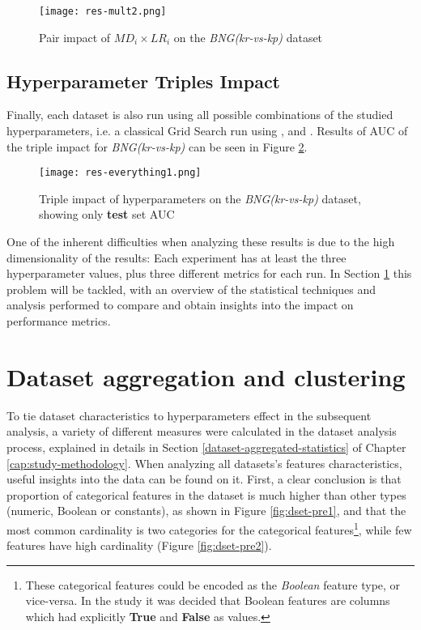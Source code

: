 \begin{figure}[!h]
    \centering
    \texttt{[image: res-mult2.png]}
    \caption{Pair impact of $MD_i \times LR_i$  on the \textit{BNG(kr-vs-kp)} dataset}
    \label{fig:res-mult2}
\end{figure}

\subsection{Hyperparameter Triples Impact}

Finally, each dataset is also run using all possible combinations of the studied hyperparameters, i.e. a classical Grid Search run using ,  and . Results of AUC of the triple impact for  \textit{BNG(kr-vs-kp)} can be seen in Figure \ref{fig:res-all1}.

\begin{figure}[!h]
    \centering
    \texttt{[image: res-everything1.png]} 
    \caption{Triple impact of hyperparameters on the \textit{BNG(kr-vs-kp)} dataset, showing only \textbf{test} set AUC}
    \label{fig:res-all1}
\end{figure}

One of the inherent difficulties when analyzing these results is due to the high dimensionality of the results: Each experiment has at least the three hyperparameter values, plus three different metrics for each run. In Section \ref{} this problem will be tackled, with an overview of the statistical techniques and analysis performed to compare and obtain insights into the impact on performance metrics.

\section{Dataset aggregation and clustering}

To tie dataset characteristics to hyperparameters effect in the subsequent analysis, a variety of different measures were calculated in the dataset analysis process, explained in details in Section \ref{dataset-aggregated-statistics} of Chapter \ref{cap:study-methodology}. When analyzing all datasets's features characteristics, useful insights into the data can be found on it. First, a clear conclusion is that proportion of categorical features in the dataset is much higher than  other types (numeric, Boolean or constants), as shown in Figure \ref{fig:dset-pre1}, and that the most common cardinality is two categories for the categorical features\footnote{These categorical features could be encoded as the \textit{Boolean} feature type, or vice-versa. In the study it was decided that Boolean features are columns which had explicitly \textbf{True} and \textbf{False} as values.}, while few features have high cardinality (Figure \ref{fig:dset-pre2}).

